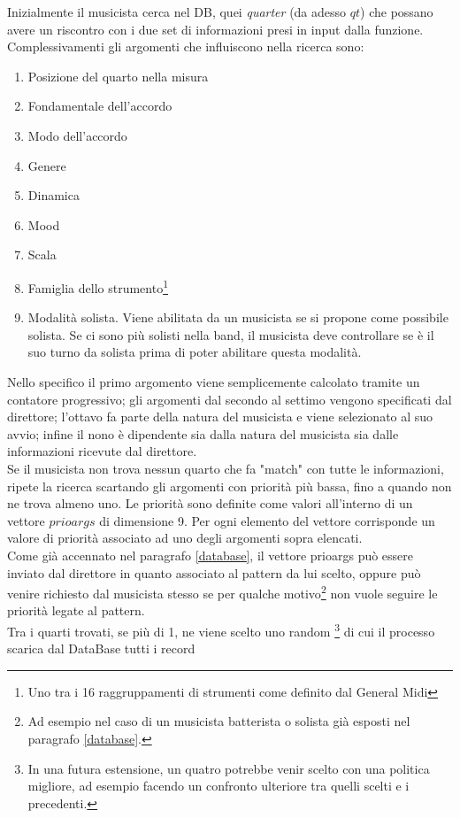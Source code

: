 Inizialmente il musicista cerca nel DB, quei \emph{quarter} (da adesso
$qt$) che possano
avere un riscontro con i due set di informazioni presi in input dalla
funzione. Complessivamenti gli argomenti che influiscono nella ricerca
sono:
\begin{enumerate}
\item Posizione del quarto nella misura
\item Fondamentale dell'accordo
\item Modo dell'accordo
\item Genere
\item Dinamica
\item Mood
\item Scala
\item Famiglia dello strumento\footnote{Uno tra i 16 raggruppamenti
di strumenti come definito dal General
Midi} %
\item Modalità solista. Viene abilitata da un musicista se si propone come
possibile solista. Se ci sono più solisti nella band, il musicista deve
controllare se è il suo turno da solista prima di poter abilitare questa
modalità.
\end{enumerate}
Nello specifico il primo argomento viene semplicemente calcolato tramite un
contatore progressivo; gli argomenti dal secondo al settimo vengono
specificati dal direttore; l'ottavo fa parte della natura del musicista
e viene selezionato al suo avvio; infine il nono è dipendente sia dalla
natura del musicista sia dalle informazioni ricevute dal direttore.\\
Se il musicista non trova nessun quarto che fa "match" con tutte le
informazioni, ripete la ricerca scartando
gli argomenti con priorità più bassa, fino a quando non ne trova almeno
uno. Le priorità sono definite come valori all'interno di un vettore
$prioargs$ di dimensione 9. Per ogni elemento del vettore corrisponde un valore di priorità
associato ad uno degli argomenti sopra elencati.\\
Come già accennato nel paragrafo \ref{database}, il vettore prioargs può
essere inviato dal direttore in quanto associato al pattern da lui
scelto, oppure può venire richiesto dal musicista
stesso se per qualche motivo\footnote{Ad esempio nel caso di un
musicista batterista o solista già esposti nel paragrafo \ref{database}.} 
non vuole seguire le priorità legate al pattern.\\
Tra i quarti trovati, se più di 1, ne viene scelto uno random
\footnote{In una futura estensione, un quatro potrebbe venir scelto con
una politica migliore, ad esempio facendo un confronto ulteriore tra quelli
scelti e i precedenti.} di cui il processo scarica dal DataBase tutti i record
